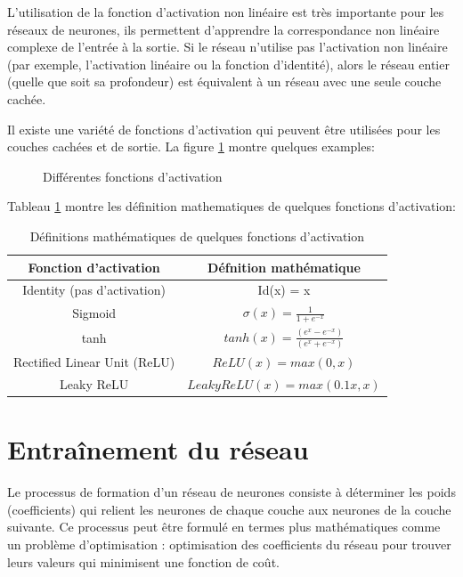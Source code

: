 L'utilisation de la fonction d'activation non linéaire est très importante pour les réseaux de neurones, ils permettent d'apprendre la correspondance non linéaire complexe de l'entrée à la sortie. Si le réseau n'utilise pas l'activation non linéaire (par exemple, l'activation linéaire ou la fonction d'identité), alors le réseau entier (quelle que soit sa profondeur) est équivalent à un réseau avec une seule couche cachée.

Il existe une variété de fonctions d'activation qui peuvent être utilisées pour les couches cachées et de sortie. La figure \ref{fig:activation-function} montre quelques examples:

\begin{figure}[h]
    \centering
	
    \caption{Différentes fonctions d'activation}
    \label{fig:activation-function}
\end{figure}

Tableau \ref{table:activation-functions} montre les définition mathematiques de quelques fonctions d'activation:

\begin{table}[h]
    \centering
    \begin{tabular}{c|c}
        \hline
        Fonction d'activation & Défnition mathématique \\
        \hline
        Identity (pas d'activation) & Id(x) = x \\
        Sigmoid & $\sigma(x)= \frac{1}{1+e^{-x}}$ \\
        tanh & $tanh(x)=\frac{(e^x-e^{-x})}{(e^x+e^{-x})}$\\
        Rectified Linear Unit (ReLU) & $ReLU(x)=max(0,x)$\\
        Leaky ReLU & $LeakyReLU(x)=max(0.1 x,x)$\\
    \hline
    \end{tabular}
    \caption{Définitions mathématiques de quelques fonctions d'activation}
    \label{table:activation-functions}
\end{table}

\section{Entraînement du réseau}
Le processus de formation d'un réseau de neurones consiste à déterminer les poids (coefficients) qui relient les neurones de chaque couche aux neurones de la couche suivante. Ce processus peut être formulé en termes plus mathématiques comme un problème d'optimisation : optimisation des coefficients du réseau pour trouver leurs valeurs qui minimisent une fonction de coût.

